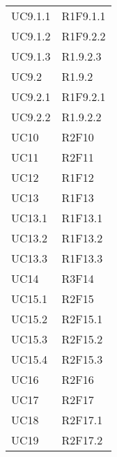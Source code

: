 \begin{longtable} {
		>{\centering}p{28mm}  
		>{}p{20mm}
		}
		UC9.1.1 & R1F9.1.1 \TBstrut \\ [2mm]
		UC9.1.2 & R1F9.2.2 \TBstrut \\ [2mm]
		UC9.1.3 & R1.9.2.3 \TBstrut \\ [2mm]
		UC9.2 & R1.9.2 \TBstrut \\ [2mm]
		UC9.2.1 & R1F9.2.1 \TBstrut \\ [2mm]
		UC9.2.2 & R1.9.2.2 \TBstrut \\ [2mm]
		UC10 & R2F10 \TBstrut \\ [2mm]
		UC11 & R2F11 \TBstrut \\ [2mm]
		UC12 & R1F12 \TBstrut \\ [2mm]
		UC13 & R1F13 \TBstrut \\ [2mm]
		UC13.1 & R1F13.1 \TBstrut \\ [2mm]
		UC13.2 & R1F13.2 \TBstrut \\ [2mm]
		UC13.3 & R1F13.3 \TBstrut \\ [2mm]
		UC14 & R3F14 \TBstrut \\ [2mm]
		UC15.1 & R2F15 \TBstrut \\ [2mm]
		UC15.2 & R2F15.1 \TBstrut \\ [2mm]
		UC15.3 & R2F15.2 \TBstrut \\ [2mm]
		UC15.4 & R2F15.3 \TBstrut \\ [2mm]
		UC16 & R2F16 \TBstrut \\ [2mm]
		UC17 & R2F17 \TBstrut \\ [2mm]
		UC18 & R2F17.1 \TBstrut \\ [2mm]
		UC19 & R2F17.2		
	\end{longtable}

